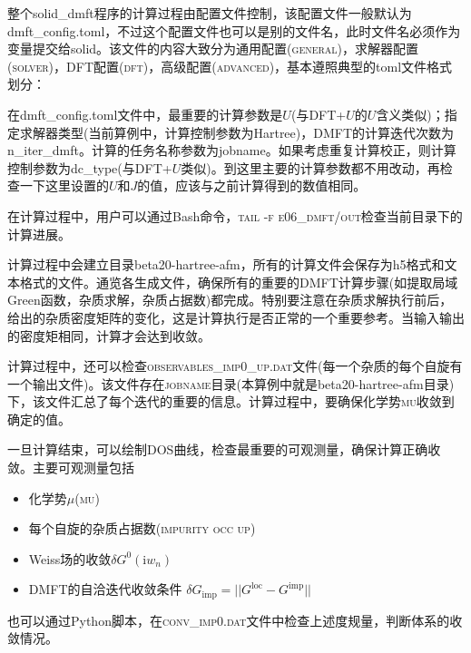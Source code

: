 
整个\textrm{solid\_dmft}程序的计算过程由配置文件控制，该配置文件一般默认为\textrm{dmft\_config.toml}，不过这个配置文件也可以是别的文件名，此时文件名必须作为变量提交给\textrm{solid\dmft}。该文件的内容大致分为通用配置\textsc{(general)}，求解器配置\textsc{(solver)}，\textrm{DFT}配置\textsc{(dft)}，高级配置\textsc{(advanced)}，基本遵照典型的\textrm{toml}文件格式划分：

在\textrm{dmft\_config.toml}文件中，最重要的计算参数是$U$(与\textrm{DFT+}$U$的$U$含义类似)；指定求解器类型(当前算例中，计算控制参数为\textrm{Hartree})，\textrm{DMFT}的计算迭代次数为\textrm{n\_iter\_dmft}。计算的任务名称参数为\textrm{jobname}。如果考虑重复计算校正，则计算控制参数为\textrm{dc\_type}(与\textrm{DFT+}$U$类似)。到这里主要的计算参数都不用改动，再检查一下这里设置的$U$和$J$的值，应该与之前计算得到的数值相同。

在计算过程中，用户可以通过\textrm{Bash}命令，\textsc{tail -f e06\_dmft/out}检查当前目录下的计算进展。

计算过程中会建立目录\textrm{beta20-hartree-afm}，所有的计算文件会保存为\textrm{h5}格式和文本格式的文件。通览各生成文件，确保所有的重要的\textrm{DMFT}计算步骤(如提取局域\textrm{Green}函数，杂质求解，杂质占据数)都完成。特别要注意在杂质求解执行前后，给出的杂质密度矩阵的变化，这是计算执行是否正常的一个重要参考。当输入输出的密度矩相同，计算才会达到收敛。

计算过程中，还可以检查\textsc{observables\_imp0\_up.dat}文件(每一个杂质的每个自旋有一个输出文件)。该文件存在\textsc{jobname}目录(本算例中就是\textrm{beta20-hartree-afm}目录)下，该文件汇总了每个迭代的重要的信息。计算过程中，要确保化学势\textsc{mu}收敛到确定的值。

一旦计算结束，可以绘制\textrm{DOS}曲线，检查最重要的可观测量，确保计算正确收敛。主要可观测量包括
\begin{itemize}
	\item 化学势$\mu$(\textsc{mu})
	\item 每个自旋的杂质占据数(\textsc{impurity occ up})
	\item \textrm{Weiss}场的收敛$\delta G^0(\mathrm{i}w_n)$
	\item \textrm{DMFT}的自洽迭代收敛条件 $\delta G_{\mathrm{imp}}=||G^{\mathrm{loc}}-G^{\mathrm{imp}}||$
\end{itemize}
也可以通过\textrm{Python}脚本，在\textsc{conv\_imp0.dat}文件中检查上述度规量，判断体系的收敛情况。

